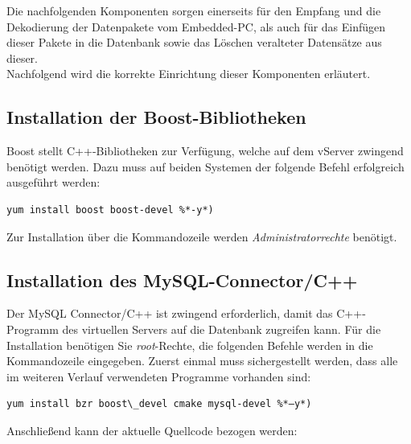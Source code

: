 \documentclass[fontsize = 12pt, paper = a4]{scrreprt}
\begin{document}
Die nachfolgenden Komponenten sorgen einerseits für den Empfang und die Dekodierung der Datenpakete vom Embedded-PC, als auch für das Einfügen dieser Pakete in die Datenbank sowie das Löschen veralteter Datensätze aus dieser. \\
Nachfolgend wird die korrekte Einrichtung dieser Komponenten erläutert.

\subsection{Installation der Boost-Bibliotheken}

Boost stellt C++-Bibliotheken zur Verfügung, welche auf dem vServer zwingend benötigt werden.
Dazu muss auf beiden Systemen der folgende Befehl erfolgreich ausgeführt werden:

\vspace*{4mm}
\begin{lstlisting}[frame=single]
yum install boost boost-devel %*-y*)
\end{lstlisting} 
\vspace*{-2mm}
    
    
Zur Installation über die Kommandozeile werden \textit{Administratorrechte} benötigt.

\subsection{Installation des MySQL-Connector/C++}

Der MySQL Connector/C++ ist zwingend erforderlich, damit das C++-Programm des virtuellen Servers auf die Datenbank zugreifen kann. Für die Installation benötigen Sie \textit{root}-Rechte, die folgenden Befehle werden in die Kommandozeile eingegeben.
Zuerst einmal muss sichergestellt werden, dass alle im weiteren Verlauf verwendeten Programme vorhanden sind:

\vspace*{4mm}
\begin{lstlisting}[frame=single]
yum install bzr boost\_devel cmake mysql-devel %*–y*)
\end{lstlisting} 
\vspace*{-2mm}

Anschließend kann der aktuelle Quellcode bezogen werden:

\vspace*{4mm}
\begin{lstlisting}[frame=single]
%*bzr branch lp:~mysql/mysql-connector-cpp/trunk ./mysql-connector-cpp*) 
\end{lstlisting} 
\vspace*{-2mm}
\end{document}
